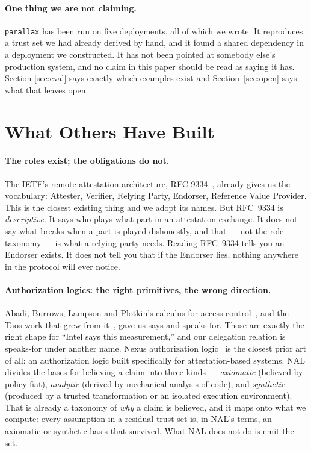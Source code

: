 \documentclass[11pt]{article}
\newcommand{\parallax}{\texttt{parallax}}
\begin{document}
\paragraph{One thing we are not claiming.} \parallax{} has been run on five
deployments, all of which we wrote. It reproduces a trust set we had already
derived by hand, and it found a shared dependency in a deployment we
constructed. It has not been pointed at somebody else's production system,
and no claim in this paper should be read as saying it has. Section
\ref{sec:eval} says exactly which examples exist and Section~\ref{sec:open}
says what that leaves open.

\section{What Others Have Built}
\label{sec:related}

\paragraph{The roles exist; the obligations do not.} The IETF's remote
attestation architecture, RFC 9334~\cite{rfc9334}, already gives us the
vocabulary: Attester, Verifier, Relying Party, Endorser, Reference Value
Provider. This is the closest existing thing and we adopt its names. But
RFC~9334 is \emph{descriptive}. It says who plays what part in an attestation
exchange. It does not say what breaks when a part is played dishonestly, and
that --- not the role taxonomy --- is what a relying party needs. Reading
RFC~9334 tells you an Endorser exists. It does not tell you that if the
Endorser lies, nothing anywhere in the protocol will ever notice.

\paragraph{Authorization logics: the right primitives, the wrong direction.}
Abadi, Burrows, Lampson and Plotkin's calculus for access
control~\cite{abadi1993}, and the Taos work that grew from
it~\cite{lampson1992}, gave us \textsf{says} and \textsf{speaks-for}. Those
are exactly the right shape for ``Intel says this measurement,'' and our
delegation relation is \textsf{speaks-for} under another name. Nexus
authorization logic~\cite{nal} is the closest prior art of all: an
authorization logic built specifically for attestation-based systems. NAL
divides the bases for believing a claim into three kinds --- \emph{axiomatic}
(believed by policy fiat), \emph{analytic} (derived by mechanical analysis of
code), and \emph{synthetic} (produced by a trusted transformation or an
isolated execution environment). That is already a taxonomy of \emph{why} a
claim is believed, and it maps onto what we compute: every assumption in a
residual trust set is, in NAL's terms, an axiomatic or synthetic basis that
survived. What NAL does not do is emit the set.
\end{document}

